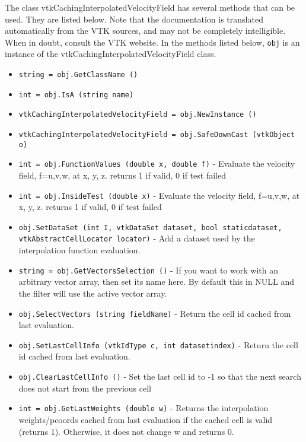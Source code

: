 The class vtkCachingInterpolatedVelocityField has several methods that can be used.
  They are listed below.
Note that the documentation is translated automatically from the VTK sources,
and may not be completely intelligible.  When in doubt, consult the VTK website.
In the methods listed below, \verb|obj| is an instance of the vtkCachingInterpolatedVelocityField class.
\begin{itemize}
\item  \verb|string = obj.GetClassName ()|

\item  \verb|int = obj.IsA (string name)|

\item  \verb|vtkCachingInterpolatedVelocityField = obj.NewInstance ()|

\item  \verb|vtkCachingInterpolatedVelocityField = obj.SafeDownCast (vtkObject o)|

\item  \verb|int = obj.FunctionValues (double x, double f)| -  Evaluate the velocity field, f={u,v,w}, at {x, y, z}.
 returns 1 if valid, 0 if test failed

\item  \verb|int = obj.InsideTest (double x)| -  Evaluate the velocity field, f={u,v,w}, at {x, y, z}.
 returns 1 if valid, 0 if test failed

\item  \verb|obj.SetDataSet (int I, vtkDataSet dataset, bool staticdataset, vtkAbstractCellLocator locator)| -  Add a dataset used by the interpolation function evaluation.

\item  \verb|string = obj.GetVectorsSelection ()| -  If you want to work with an arbitrary vector array, then set its name 
 here. By default this in NULL and the filter will use the active vector 
 array.

\item  \verb|obj.SelectVectors (string fieldName)| -  Return the cell id cached from last evaluation.

\item  \verb|obj.SetLastCellInfo (vtkIdType c, int datasetindex)| -  Return the cell id cached from last evaluation.

\item  \verb|obj.ClearLastCellInfo ()| -  Set the last cell id to -1 so that the next search does not
 start from the previous cell

\item  \verb|int = obj.GetLastWeights (double w)| -  Returns the interpolation weights/pcoords cached from last evaluation
 if the cached cell is valid (returns 1). Otherwise, it does not
 change w and returns 0.


\end{itemize}
